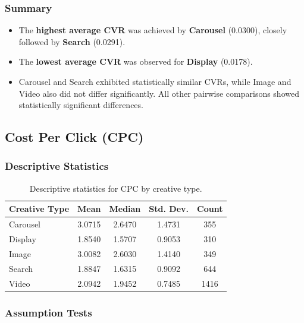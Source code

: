 \subsubsection{Summary}

\begin{itemize}
	\item The \textbf{highest average CVR} was achieved by \textbf{Carousel} (0.0300), closely followed by \textbf{Search} (0.0291).
	\item The \textbf{lowest average CVR} was observed for \textbf{Display} (0.0178).
	\item Carousel and Search exhibited statistically similar CVRs, while Image and Video also did not differ significantly. All other pairwise comparisons showed statistically significant differences.
\end{itemize}



\subsection{Cost Per Click (CPC)}\label{appendix:creative_performance_analysis_CPC}

\subsubsection{Descriptive Statistics}

\begin{table}[H]
	\centering
	\caption{Descriptive statistics for CPC by creative type.}
	\begin{tabular}{lcccc}
		\toprule
		Creative Type & Mean & Median & Std. Dev. & Count \\
		\midrule
		Carousel & 3.0715 & 2.6470 & 1.4731 & 355 \\
		Display & 1.8540 & 1.5707 & 0.9053 & 310 \\
		Image & 3.0082 & 2.6030 & 1.4140 & 349 \\
		Search & 1.8847 & 1.6315 & 0.9092 & 644 \\
		Video & 2.0942 & 1.9452 & 0.7485 & 1416 \\
		\bottomrule
	\end{tabular}
\end{table}

\subsubsection{Assumption Tests}

